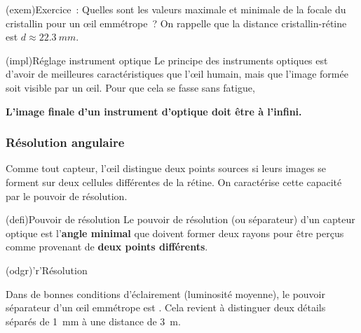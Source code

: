 \documentclass[../../main/main.tex]{subfiles}
\begin{document}
\begin{tcb}[width=\linewidth](exem){Exercice~:}
	Quelles sont les valeurs maximale et minimale de la focale du cristallin
	pour un œil emmétrope~? On rappelle que la distance cristallin-rétine est $d
		\approx \SI{22.3}{mm}$.
	\tcblower
	\vspace{4cm}
\end{tcb}

\begin{tcb}[label=impl:instrument_opt](impl){Réglage instrument optique}
	Le principe des instruments optiques est d'avoir de meilleures
	caractéristiques que l'œil humain, mais que l'image formée soit visible par
	un œil. Pour que cela se fasse sans fatigue,
	\begin{center}
		\bfseries L'image finale d'un instrument d'optique doit être à l'infini.
	\end{center}
\end{tcb}

\subsubsection{Résolution angulaire}
Comme tout capteur, l'œil distingue deux points sources si leurs images se
forment sur deux cellules différentes de la rétine. On caractérise cette
capacité par le pouvoir de résolution.
\begin{tcbraster}[raster columns=2, raster equal height=rows]
	\begin{tcb}[label=def:resolu](defi){Pouvoir de résolution}
		Le pouvoir de résolution (ou séparateur) d'un capteur optique est
		l'\textbf{angle minimal} que doivent former deux rayons pour être perçus
		comme provenant de \textbf{deux points différents}.
	\end{tcb}
	\begin{tcb}[label=odgr:resolu](odgr)'r'{Résolution}

		Dans de bonnes conditions d'éclairement (luminosité moyenne), le pouvoir
		séparateur d'un œil emmétrope est . Cela revient à distinguer deux détails séparés de
		\SI{1}{mm} à une distance de \SI{3}{m}.
	\end{tcb}
\end{tcbraster}
\end{document}
